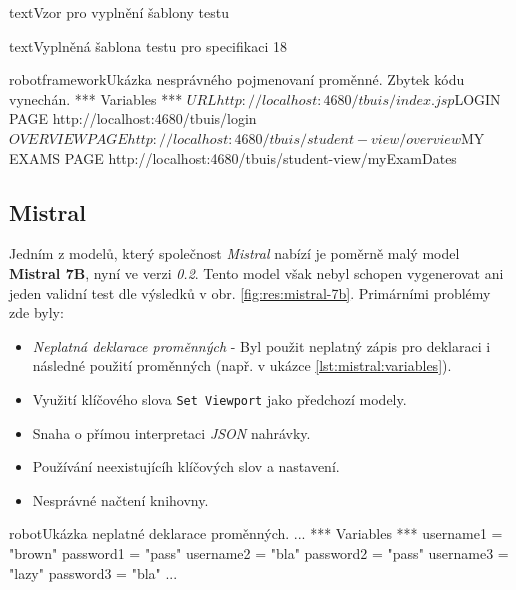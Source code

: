 \documentclass[czech, ma, kiv, he, iso690numb, pdf, viewonly]{fasthesis}
\begin{document}
\begin{code}{text}{Vzor pro vyplnění šablony testu \label{lst:template}}
{\begin{code}{text}{Vyplněná šablona testu pro specifikaci 18 \label{lst:spec18}}
{            \begin{code}{robotframework}{Ukázka nesprávného pojmenovaní proměnné. Zbytek kódu vynechán. \label{lst:wrong_variable}}
*** Variables ***
${URL}            http://localhost:4680/tbuis/index.jsp
${LOGIN PAGE}    http://localhost:4680/tbuis/login
${OVERVIEW PAGE}  http://localhost:4680/tbuis/student-view/overview
${MY EXAMS PAGE} http://localhost:4680/tbuis/student-view/myExamDates \end{code}

        \subsection{Mistral} \label{sec:res:mistral}

        Jedním z modelů, který společnost \textit{Mistral} nabízí je poměrně malý model \textbf{Mistral 7B}, nyní ve verzi \textit{0.2}. Tento model však nebyl schopen vygenerovat ani jeden validní test dle výsledků v obr. \ref{fig:res:mistral-7b}. Primárními problémy zde byly:
        \begin{itemize}
            \item \emph{Neplatná deklarace proměnných} - Byl použit neplatný zápis pro deklaraci i následné použití proměnných (např. v ukázce \ref{lst:mistral:variables}).
            \item Využití klíčového slova \verb|Set Viewport| jako předchozí modely.
            \item Snaha o přímou interpretaci \textit{JSON} nahrávky.
            \item Používání neexistujícíh klíčových slov a nastavení.
            \item Nesprávné načtení knihovny.
        \end{itemize}

        \begin{code}{robot}{Ukázka neplatné deklarace proměnných. \label{lst:mistral:variables}}
...
*** Variables ***
username1 = "brown"
password1 = "pass"
username2 = "bla"
password2 = "pass"
username3 = "lazy"
password3 = "bla"
...
        \end{code}

}
\end{code}}
\end{code}
\end{document}
